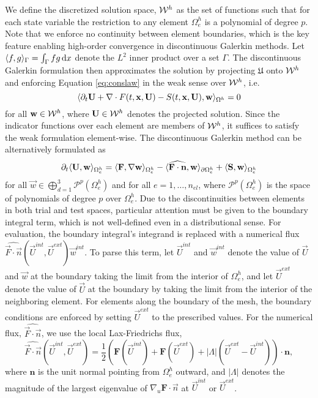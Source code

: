 We define the discretized solution space, $\mathcal{W}^h$ as the set of functions such that for each state variable the restriction to any element $\Omega_e^h$ is a polynomial of degree $p$.  Note that we enforce no continuity between element boundaries, which is the key feature enabling high-order convergence in discontinuous Galerkin methods.  Let $\langle f , g\rangle_{\Gamma} = \int_{\Gamma} fg \,\mathrm{d} x$ denote the $L^2$ inner product over a set $\Gamma$. The discontinuous Galerkin formulation then approximates the solution by projecting $\mathfrak{U}$ onto $\mathcal{W}^h$ and enforcing Equation \eqref{eq:conslaw} in the weak sense over $\mathcal{W}^h$, i.e.
\begin{equation*}
\langle  \partial_t {\bf U} + \nabla \cdot F(t,{\bf x},{\bf U}) - S(t,{\bf x}, {\bf U}) , {\bf w}\rangle_{\Omega^h} = 0
\end{equation*}
for all ${\bf w} \in \mathcal{W}^h$, where ${\bf U} \in \mathcal{W}^h$ denotes the projected solution.  %
Since the indicator functions over each element are members of $\mathcal{W}^h$, it suffices to satisfy the weak formulation element-wise.
The discontinuous Galerkin method can be alternatively formulated as
\begin{equation}
\partial_t \langle {\bf U} , {\bf w} \rangle_{\Omega^h_e} = \langle {\bf F} , \nabla{\bf w} \rangle_{\Omega^h_e} - \langle \widehat{{\bf F}\cdot {\bf n}} , {\bf w} \rangle_{\partial \Omega^h_e} + \langle {\bf S} , {\bf w} \rangle_{\Omega^h_e}
\label{eq:dg}
\end{equation}
for all $\vec{w} \in \bigoplus_{d=1}^3 \mathcal{P}^p(\Omega_e^h)$ and for all $e = 1, \ldots, n_{el}$, where $\mathcal{P}^p(\Omega_e^h)$ is the space of polynomials of degree $p$ over $\Omega_e^h$. Due to the discontinuities between elements in both trial and test spaces, particular attention must be given to the boundary integral term, which is not well-defined even in a distributional sense. For evaluation, the boundary integral's integrand is replaced with a numerical flux $\widehat{\vec{F} \cdot \vec{n}}(\vec{U}^{int}, \vec{U}^{ext}) \vec{w}^{int}$. To parse this term, let $\vec{U}^{int}$ and $\vec{w}^{int}$ denote the value of $\vec{U}$ and $\vec{w}$ at the boundary taking the limit from the interior of $\Omega^h_e$, and let $\vec{U}^{ext}$ denote the value of $\vec{U}$ at the boundary by taking the limit from the interior of the neighboring element. For elements along the boundary of the mesh, the boundary conditions are enforced by setting $\vec{U}^{ext}$ to the prescribed values. For the numerical flux, $\widehat{\vec{F}\cdot\vec{n}}$, we use the local Lax-Friedrichs flux, 
\begin{equation*}
\widehat{\vec{F} \cdot \vec{n}}(\vec{U}^{int}, \vec{U}^{ext}) = \frac{1}{2} \left( \mathbf{F}(\vec{U}^{int}) + \mathbf{F}(\vec{U}^{ext}) + |\Lambda| (\vec{U}^{ext} - \vec{U}^{int}) \right) \cdot \mathbf{n},
\end{equation*}
where $\mathbf{n}$ is the unit normal pointing from $\Omega^h_e$ outward, and $|\Lambda|$ denotes the magnitude of the largest eigenvalue of $\nabla_u \mathbf{F} \cdot \vec{n}$ at $\vec{U}^{int}$ or $\vec{U}^{ext}$.

